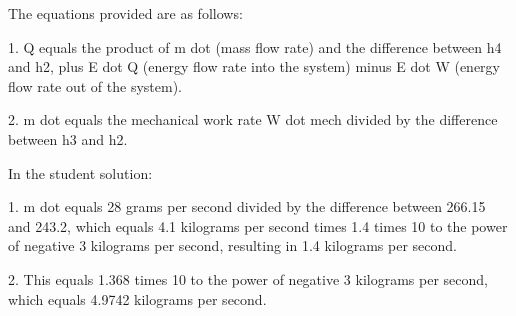 The equations provided are as follows:

1. Q equals the product of m dot (mass flow rate) and the difference between h4 and h2, plus E dot Q (energy flow rate into the system) minus E dot W (energy flow rate out of the system).

2. m dot equals the mechanical work rate W dot mech divided by the difference between h3 and h2.

In the student solution:

1. m dot equals 28 grams per second divided by the difference between 266.15 and 243.2, which equals 4.1 kilograms per second times 1.4 times 10 to the power of negative 3 kilograms per second, resulting in 1.4 kilograms per second.

2. This equals 1.368 times 10 to the power of negative 3 kilograms per second, which equals 4.9742 kilograms per second.